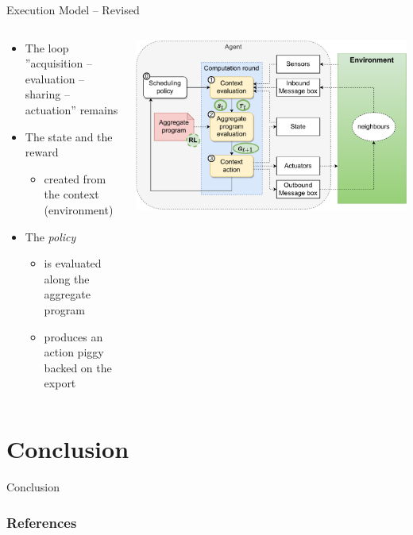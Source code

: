 \documentclass[9pt, aspectratio=169, handout]{beamer}
\begin{document}
\begin{frame}{Execution Model -- Revised}
  \begin{columns}
    \begin{column}{0.49\textwidth}
      \begin{card}
        \begin{itemize}
          \item The loop ''acquisition -- evaluation -- sharing -- actuation'' remains
          \item The state and the reward
          \begin{itemize}
            \item created from the context (environment)
          \end{itemize}
          \item The \emph{policy}
          \begin{itemize}
            \item is evaluated along the aggregate program
            \item produces an action piggy backed on the export
          \end{itemize}
        \end{itemize}
      \end{card}
    \end{column}
    \begin{column}{0.57\textwidth}  
      \begin{cardTiny}
        \includegraphics[width=\textwidth]{img/aggregate-agent-control-architecture-rl.pdf}    
      \end{cardTiny}
    \end{column}
  \end{columns}
\end{frame}
\section{Conclusion}
\begin{frame}{Conclusion}

\end{frame}


\begin{frame}[allowframebreaks]
  \frametitle{References}
  \printbibliography
\end{frame}
\end{document}

